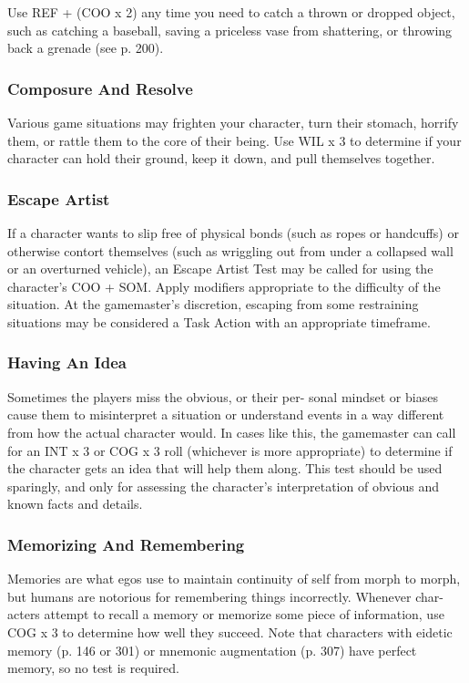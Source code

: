Use REF + (COO x 2) any time you need to catch a 
thrown or dropped object, such as catching a baseball, 
saving a priceless vase from shattering, or throwing 
back a grenade (see p. 200).

\subsubsection{Composure And Resolve}

Various game situations may frighten your character, 
turn their stomach, horrify them, or rattle them to the 
core of their being. Use WIL x 3 to determine if your 
character can hold their ground, keep it down, and 
pull themselves together.

\subsubsection{Escape Artist}

If a character wants to slip free of physical bonds (such 
as ropes or handcuffs) or otherwise contort themselves 
(such as wriggling out from under a collapsed wall or 
an overturned vehicle), an Escape Artist Test may be 
called for using the character's COO + SOM. Apply 
modifiers appropriate to the difficulty of the situation. 
At the gamemaster's discretion, escaping from some 
restraining situations may be considered a Task Action 
with an appropriate timeframe.

\subsubsection{Having An Idea}

Sometimes the players miss the obvious, or their per-
sonal mindset or biases cause them to misinterpret a 
situation or understand events in a way different from 
how the actual character would. In cases like this, the 
gamemaster can call for an INT x 3 or COG x 3 roll 
(whichever is more appropriate) to determine if the 
character gets an idea that will help them along. This 
test should be used sparingly, and only for assessing 
the character's interpretation of obvious and known 
facts and details.

\subsubsection{Memorizing And Remembering}

Memories are what egos use to maintain continuity of 
self from morph to morph, but humans are notorious 
for remembering things incorrectly. Whenever char-
acters attempt to recall a memory or memorize some 
piece of information, use COG x 3 to determine how 
well they succeed. Note that characters with eidetic 
memory (p. 146 or 301) or mnemonic augmentation 
(p. 307) have perfect memory, so no test is required.

